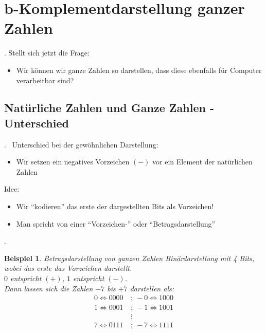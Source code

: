 \documentclass{beamer}
\newtheorem{beispiel}[satz]{Beispiel}
\newcommand{\secframe}{\begin{frame}{\insertsectionnumber. \insertsection}}
\newcommand{\subsecframe}{\begin{frame}{\insertsectionnumber.\insertsubsectionnumber \ \insertsubsection}}
\begin{document}
    

\section{b-Komplementdarstellung ganzer Zahlen}

    \secframe
        Stellt sich jetzt die Frage:
        \begin{itemize}
            \item Wir können wir ganze Zahlen so darstellen, dass diese ebenfalls für Computer verarbeitbar sind?
        \end{itemize}
    \end{frame}

    \subsection{Natürliche Zahlen und Ganze Zahlen - Unterschied}

        \subsecframe
            Unterschied bei der gewöhnlichen Darstellung:
            \begin{itemize}
                \item Wir setzen ein negatives Vorzeichen $(-)$ vor ein Element der natürlichen Zahlen
            \end{itemize}
            Idee:
            \begin{itemize}
                \item Wir ``kodieren'' das erste der dargestellten Bits als Vorzeichen!
                \item Man spricht von einer ``Vorzeichen-'' oder ``Betragsdarstellung''
            \end{itemize}
        \end{frame}

        \subsecframe
            \begin{beispiel}{Betragsdarstellung von ganzen Zahlen} \label{bsp:Betragsdarstellung}
                Binärdarstellung mit 4 Bits, wobei das erste das Vorzeichen darstellt. \\
                $0$ entspricht $(+)$, $1$ entspricht $(-)$. \\
                Dann lassen sich die Zahlen $-7$ bis $+7$ darstellen als:
                \begin{align*}
                0 \Leftrightarrow 0000  ~&;~  -0 \Leftrightarrow 1000 \\
                1 \Leftrightarrow 0001  ~&;~  -1 \Leftrightarrow 1001 \\
                & \vdots \\
                7 \Leftrightarrow 0111  ~&;~  -7 \Leftrightarrow 1111
                \end{align*}
            \end{beispiel}
        \end{frame}
\end{document}
